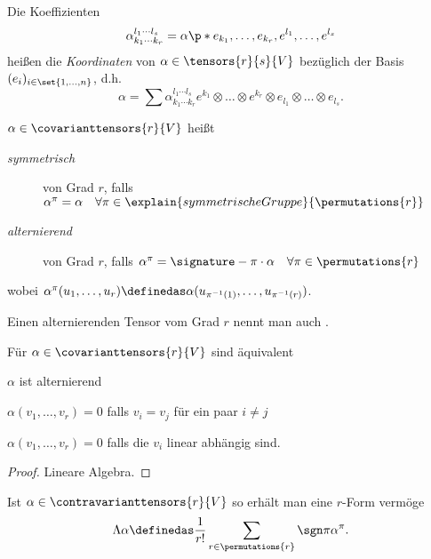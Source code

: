 Die Koeffizienten
\begin{equation*}
\alpha_{k_1\cdots k_r}^{l_1\cdots l_s}=\alpha\p*{ e_{k_1},\ldots ,e_{k_r},e^{l_1},\ldots ,e^{l_s} }
\end{equation*}
heißen die \emph{Koordinaten} von \( \alpha\in \tensors{r}{s}{V} \) bezüglich der Basis \( (e_i)_{i\in\set{1,\ldots ,n}} \), d.h.
\begin{equation*}
\alpha=\sum \alpha_{k_1\cdots k_r}^{l_1\cdots l_s} e^{k_1}\otimes\ldots \otimes e^{k_r}\otimes e_{l_1}\otimes\ldots \otimes e_{l_s}.
\end{equation*}


\begin{definition}
\( \alpha\in \covarianttensors{r}{V} \) heißt
\begin{description}
    \item[\emph{symmetrisch}] von Grad \( r \), falls \( \alpha^\pi=\alpha\quad  \forall \pi\in \explain{symmetrische Gruppe}{\permutations{r}} \)\\
    \item[\emph{alternierend}] von Grad \( r \), falls \( \alpha^\pi=\signature-{\pi} \cdot \alpha\quad  \forall \pi\in \permutations{r}\)
\end{description}
wobei \( \alpha^\pi(u_1,\ldots ,u_r)\definedas \alpha(u_{\pi^{-1}(1)},\ldots ,u_{\pi^{-1}(r)}) \).

Einen alternierenden Tensor vom Grad \( r \) nennt man auch .
\end{definition}

\begin{lemma}
Für \( \alpha\in \covarianttensors{r}{V} \) sind äquivalent \begin{eigenschaftenenumerate}
    \item \( \alpha \) ist alternierend
    \item \( \alpha(v_1,\ldots ,v_r) =0 \) falls \( v_i=v_j \) für ein paar \( i \neq j \)
    \item \( \alpha(v_1,\ldots ,v_r)=0 \) falls die \( v_i \) linear abhängig sind.
\end{eigenschaftenenumerate}
\end{lemma}

\begin{proof}
Lineare Algebra.
\end{proof}

\begin{bemerkung*}
Ist \( \alpha\in \contravarianttensors{r}{V} \) so erhält man eine \( r \)-Form vermöge 
\begin{equation*}
    \Lambda\alpha\definedas \frac{1}{r!} \sum_{r\in \permutations{r}}\sgn\pi\alpha^\pi.
\end{equation*}
\end{bemerkung*}

